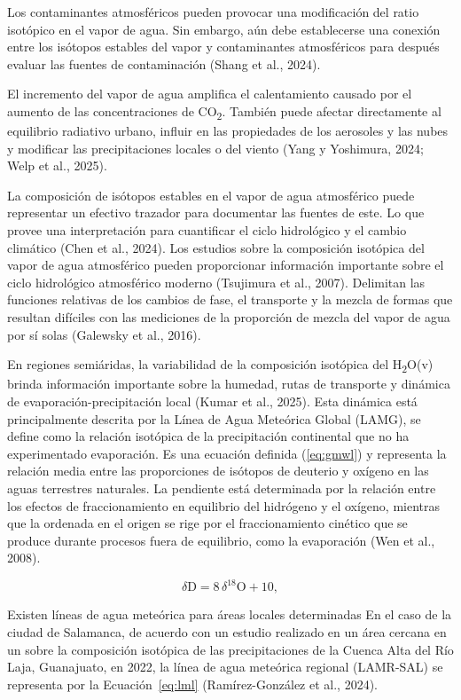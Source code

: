 Los contaminantes atmosféricos pueden provocar una modificación del ratio isotópico
en el vapor de agua. Sin embargo, aún debe
establecerse una conexión entre los isótopos estables del vapor y
contaminantes atmosféricos para después evaluar las fuentes de
contaminación (Shang et al., 2024).

El incremento del vapor de agua amplifica el calentamiento causado por
el aumento de las concentraciones de CO\textsubscript{2}. También puede afectar directamente al equilibrio
radiativo urbano, influir en las propiedades de los aerosoles y las
nubes y modificar las precipitaciones locales o del viento
(Yang y Yoshimura, 2024; Welp et al., 2025).

La composición de isótopos estables en el vapor de agua atmosférico puede
representar un efectivo trazador para documentar las fuentes de este. Lo que provee
una interpretación para cuantificar el ciclo hidrológico y el cambio
climático (Chen et al., 2024). Los estudios
sobre la composición isotópica del vapor de agua atmosférico pueden
proporcionar información importante sobre el ciclo hidrológico
atmosférico moderno (Tsujimura et al., 2007). Delimitan las funciones relativas de los cambios
de fase, el transporte y la mezcla de formas que resultan difíciles con
las mediciones de la proporción de mezcla del vapor de agua por sí
solas (Galewsky et al., 2016).

En regiones semiáridas, la variabilidad de la composición isotópica del
H\textsubscript{2}O(v) brinda información importante sobre la humedad,
rutas de transporte y dinámica de evaporación-precipitación local
(Kumar et al., 2025). Esta dinámica está principalmente 
descrita por la Línea de Agua Meteórica Global (LAMG), se 
define como la relación isotópica de la precipitación 
continental que no ha experimentado evaporación. Es 
una ecuación definida (\ref{eq:gmwl}) y representa la relación media 
entre las proporciones de isótopos de 
deuterio y oxígeno en las aguas terrestres naturales.
La pendiente está determinada por
la relación entre los efectos de fraccionamiento en equilibrio del
hidrógeno y el oxígeno, mientras que la ordenada en el origen se rige por
el fraccionamiento cinético que se produce durante procesos fuera de equilibrio,
como la evaporación (Wen et al., 2008).
 
\begin{equation}
  \delta\mathrm{D} = 8\,\delta^{18}\mathrm{O} + 10,
  \label{eq:gmwl}
\end{equation}

Existen líneas de agua meteórica para áreas locales determinadas 
En el caso de la ciudad de Salamanca, de acuerdo con un estudio realizado
en un área cercana en un sobre la composición isotópica de
las precipitaciones de la Cuenca Alta del Río Laja, Guanajuato, en
2022, la línea de agua meteórica regional (LAMR-SAL) se representa por la
Ecuación~\ref{eq:lml} (Ramírez-González et al., 2024).

